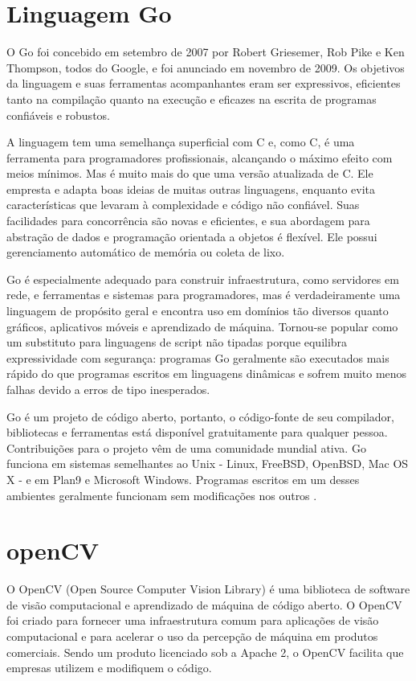 \documentclass[12pt, %
openright, 
oneside, %
a4paper,    %
brazil]{facom-ufu-abntex2}
\begin{document}
\section{Linguagem Go}

O Go foi concebido em setembro de 2007 por Robert Griesemer, Rob Pike e Ken
Thompson, todos do Google, e foi anunciado em novembro de 2009. Os objetivos da
linguagem e suas ferramentas acompanhantes eram ser expressivos, eficientes
tanto na compilação quanto na execução e eficazes na escrita de programas
confiáveis e robustos.

A linguagem tem uma semelhança superficial com C e, como C, é uma ferramenta
para programadores profissionais, alcançando o máximo efeito com meios mínimos.
Mas é muito mais do que uma versão atualizada de C. Ele empresta e adapta boas
ideias de muitas outras linguagens, enquanto evita características que levaram
à complexidade e código não confiável. Suas facilidades para concorrência são
novas e eficientes, e sua abordagem para abstração de dados e programação
orientada a objetos é flexível. Ele possui gerenciamento automático de memória
ou coleta de lixo.

Go é especialmente adequado para construir infraestrutura, como servidores em
rede, e ferramentas e sistemas para programadores, mas é verdadeiramente uma
linguagem de propósito geral e encontra uso em domínios tão diversos quanto
gráficos, aplicativos móveis e aprendizado de máquina. Tornou-se popular como
um substituto para linguagens de script não tipadas porque equilibra
expressividade com segurança: programas Go geralmente são executados mais
rápido do que programas escritos em linguagens dinâmicas e sofrem muito menos
falhas devido a erros de tipo inesperados.

Go é um projeto de código aberto, portanto, o código-fonte de seu compilador,
bibliotecas e ferramentas está disponível gratuitamente para qualquer pessoa.
Contribuições para o projeto vêm de uma comunidade mundial ativa. Go funciona
em sistemas semelhantes ao Unix - Linux, FreeBSD, OpenBSD, Mac OS X - e em
Plan9 e Microsoft Windows. Programas escritos em um desses ambientes geralmente
funcionam sem modificações nos outros \cite{donovan2015go}.

\section{openCV}

O OpenCV (Open Source Computer Vision Library) é uma biblioteca de software de
visão computacional e aprendizado de máquina de código aberto. O OpenCV foi
criado para fornecer uma infraestrutura comum para aplicações de visão
computacional e para acelerar o uso da percepção de máquina em produtos
comerciais. Sendo um produto licenciado sob a Apache 2, o OpenCV facilita que
empresas utilizem e modifiquem o código.
\end{document}
